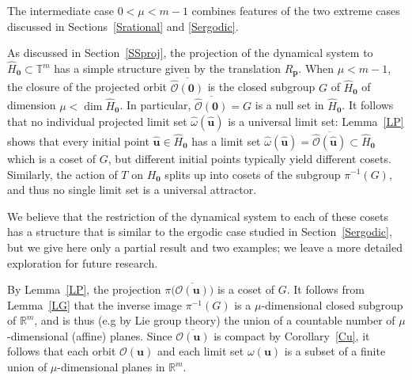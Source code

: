 \documentclass[11pt,reqno,tbtags,a4paper]{amsart}
\numberwithin{equation}{section}
\theoremstyle{plain}%
\theoremstyle{definition}
\theoremstyle{remark}
\newcounter{cases}
\newcommand{\refC}[1]{Corollary~\ref{#1}}
\newcommand{\refL}[1]{Lemma~\ref{#1}}
\newcommand{\refS}[1]{Section~\ref{#1}}
\newcommand{\refSs}[1]{Sections~\ref{#1}}
\newcommand{\refSS}[1]{Section~\ref{#1}}
\newcommand\bigpar[1]{\bigl(#1\bigr)}
\newcommand\punkt{\xperiod}    %
\newcommand\eg{e.g\punkt}
\newcommand\bbR{\mathbb R}
\newcommand\bbT{\mathbb T}
\newcommand\gO{\hat{\cO}}
\newcommand\cL{{\omega}}
\newcommand\hcL{\hat{\cL}}
\newcommand\cO{\mathcal O}
\newcommand\qw{^{-1}}
\newcommand\Ho{H_{\0}}
\newcommand\hHo{\hH_{\0}}
\newcommand\vp{\mathbf{p}}
\newcommand\vu{\mathbf{u}}
\newcommand\hvu{{\hat{\mathbf{u}}}}
\newcommand\Rp{R_\vp}
\newcommand\bcO[1]{\overline{\cO(#1)}}
\newcommand\bgO[1]{\overline{\gO(#1)}}
\newcommand\hH{\widehat{H}}
\newcommand\0{{\boldsymbol 0}}
\newcommand\1{{\boldsymbol 1}}
\begin{document}
The intermediate case $0<\mu<m-1$ combines features of the two extreme cases
discussed in \refSs{Srational} and \ref{Sergodic}.

As discussed in \refSS{SSproj},
the projection of the dynamical system to $\hHo\subset\bbT^m$ 
has a simple structure given by the translation $\Rp$.
When $\mu<m-1$, the closure of the projected orbit
$\bgO{\0}$ is the closed subgroup $G$ of $\hHo$ of dimension $\mu<\dim \hHo$.
In particular, $\bgO{\0}=G$ is a null set in $\hHo$.
It follows that no individual projected limit set $\hcL(\hvu)$ is a universal
limit set:
\refL{LP} shows that
every  initial point $\hvu\in\hHo$ has a limit set
$\hcL(\hvu)=\bgO{\hvu}\subset\hHo$ 
which is a coset of $G$, but different initial points typically yield different
cosets. Similarly,
the action of
$T$ on $\Ho$ splits up into cosets of the subgroup $\pi\qw(G)$,
and thus no single limit set is a universal attractor.

We believe that the restriction of the dynamical system to each of these
cosets has a structure that is similar to the ergodic case studied in
\refS{Sergodic}, but we give here only a partial result and 
two examples; we  leave a more 
detailed exploration for future research.

By \refL{LP}, the projection $\pi\bigpar{\bcO\vu}$ is a coset
of $G$.
It follows from  \refL{LG} that
the inverse image $\pi\qw(G)$ is a $\mu$-dimensional closed
subgroup of $\bbR^m$,
and is thus (\eg{} by Lie group theory)
the union of a countable number of $\mu$-dimensional (affine) planes.
Since $\bcO\vu$ is compact by \refC{Cu}, it follows that each orbit
$\cO(\vu)$ and each limit set
$\cL(\vu)$ is a subset of a finite union of $\mu$-dimensional planes in
$\bbR^m$. 
\end{document}
